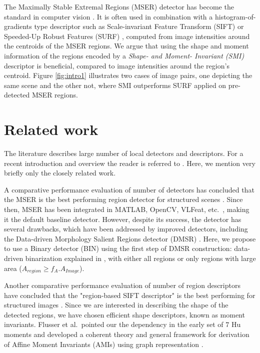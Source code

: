 \documentclass[a4paper,11pt]{article}
\begin{document}
The Maximally Stable Extremal Regions (MSER) detector has become the standard in computer vision \cite{ Matas2002BMVC}. It is often used in combination with a histogram-of-gradients type descriptor such as Scale-invariant Feature Transform (SIFT) or Speeded-Up Robust Features (SURF) \cite{Bay2008}, computed from image intensities around the centroids of the MSER regions. We argue that using the shape and moment information of the regions encoded by a {\em Shape- and Moment- Invariant (SMI)} descriptor is beneficial, compared to image intensities around the region's centroid. Figure \ref{fig:intro1} illustrates two cases of image pairs, one depicting the same scene and the other not, where SMI outperforms SURF applied on pre-detected MSER regions.

\section{Related work}
The literature describes large number of local detectors and descriptors. For a recent introduction and overview the reader is referred to \cite{Hassaballah:2016}. Here, we mention very briefly only the closely related work.

A comparative performance evaluation of number of detectors has concluded that the MSER is the best performing region detector for structured scenes \cite{Mikolajczyk:2005}. Since then, MSER has been integrated in MATLAB, OpenCV, VLFeat, etc.~, making it the default baseline detector. However, despite its success, the detector has several drawbacks, which have been addressed by improved detectors, including the Data-driven Morphology Salient Regions detector (DMSR) \cite{Ranguelova2016AICCSA}. Here, we propose to use a Binary detector (BIN) using the first step of DMSR construction: data-driven binarization explained in \cite{Ranguelova2016AICCSA}, with either all regions or only regions with large area ($A_{region} \ge f_A.A_{Image}$).

Another comparative performance evaluation of number of region descriptors have concluded that the "region-based SIFT descriptor" is the best performing for structured images \cite{Mikolajczyk:descr:2005}. Since we are interested in describing the shape of the detected regions, we have chosen efficient shape descriptors, known as moment invariants. Flusser et al.~pointed our the dependency in the early set of $7$ Hu moments and developed a coherent theory and general framework for derivation of Affine Moment Invariants (AMIs) using graph representation \cite{SukF04, Flusser09a}.
\end{document}
